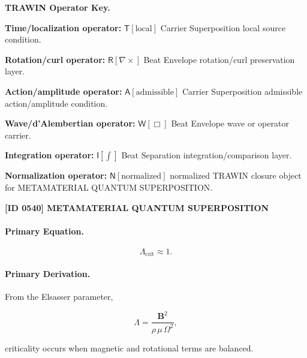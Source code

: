 \par\vspace{0.45\baselineskip}
\noindent\begin{minipage}[t]{\linewidth}
\begingroup
\small
\raggedright
\textbf{TRAWIN Operator Key.}\par
\noindent\textbf{Time/localization operator:} $\mathsf{T}\!\left[\mathrm{local}\right]$ Carrier Superposition local source condition.\par
\noindent\textbf{Rotation/curl operator:} $\mathsf{R}\!\left[\nabla\times\right]$ Beat Envelope rotation/curl preservation layer.\par
\noindent\textbf{Action/amplitude operator:} $\mathsf{A}\!\left[\mathrm{admissible}\right]$ Carrier Superposition admissible action/amplitude condition.\par
\noindent\textbf{Wave/d'Alembertian operator:} $\mathsf{W}\!\left[\Box\right]$ Beat Envelope wave or operator carrier.\par
\noindent\textbf{Integration operator:} $\mathsf{I}\!\left[\int\right]$ Beat Separation integration/comparison layer.\par
\noindent\textbf{Normalization operator:} $\mathsf{N}\!\left[\mathrm{normalized}\right]$ normalized TRAWIN closure object for METAMATERIAL QUANTUM SUPERPOSITION.\par
\endgroup
\end{minipage}

\clearpage
\noindent\textbf{[ID 0540] METAMATERIAL QUANTUM SUPERPOSITION}\par
\vspace{0.35em}
\paragraph{Primary Equation.}
\begin{equation}
\Lambda_{\mathrm{crit}}\approx 1 .
\end{equation}

\paragraph{Primary Derivation.}
From the Elsasser parameter,

\begin{equation}
\Lambda
=
\frac{\mathbf{B}^2}
{\rho\,\mu\,\Omega^2},
\end{equation}

criticality occurs when magnetic and rotational terms are balanced.

